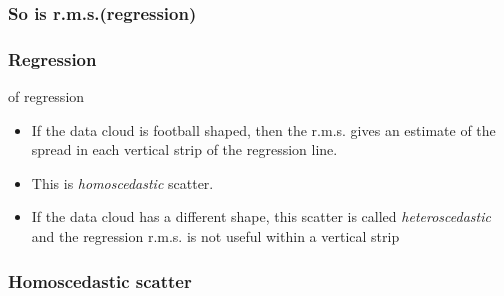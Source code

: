 \documentclass[handout]{beamer}
\begin{document}
   \begin{frame}
   \frametitle{So is r.m.s.(regression)}
   \begin{center}
   \end{center}

   \end{frame}


   \begin{frame} \frametitle{Regression}

   \begin{block}
   { of regression}
   \begin{itemize}
   \item If the data cloud is football shaped,
   then the r.m.s. gives an estimate of the spread
   in each vertical strip of the regression line.

   \item This is {\em \color{red} homoscedastic} scatter.
   \item If the data cloud has a different shape, this scatter is
   called {\em \color{red} heteroscedastic} and the regression
   r.m.s. is not useful within a vertical strip

   \end{itemize}
   \end{block}
   \end{frame}



   \begin{frame}
   \frametitle{Homoscedastic scatter}
   \begin{center}
   \end{center}

   \end{frame}
\end{document}
